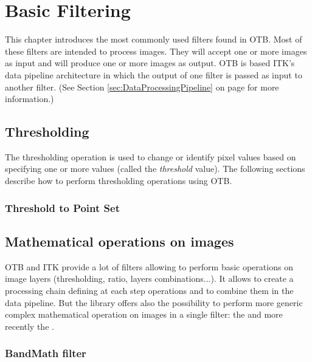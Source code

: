 \chapter{Basic Filtering}


This chapter introduces the most commonly used filters found in OTB.
Most of these filters are intended to process images. They will accept one or
more images as input and will produce one or more images as output. OTB is
based ITK's data pipeline architecture in which the output of one filter is
passed as input to another filter. (See Section
\ref{sec:DataProcessingPipeline} on page \pageref{sec:DataProcessingPipeline}
for more information.)


\section{Thresholding}
\ifitkFullVersion
\label{sec:ThresholdingFiltering}
\fi

The thresholding operation is used to change or identify pixel values based
on specifying one or more values (called the \emph{threshold} value). The
following sections describe how to perform thresholding operations using
OTB.

\subsection{Threshold to Point Set}
\label{sec:ThresholdImageToPointSetFilter}

\ifitkFullVersion

\fi



\section{Mathematical operations on images}
OTB and ITK provide a lot of filters allowing to perform basic operations on image layers (thresholding, ratio, layers combinations...).
It allows to create a processing chain defining at each step operations and to combine them in the data pipeline.
But the library offers also the possibility to perform more generic complex mathematical operation on images in a single filter: the
 and more recently the .

\subsection{BandMath filter}
\label{sec:BandMathImageFilter}

